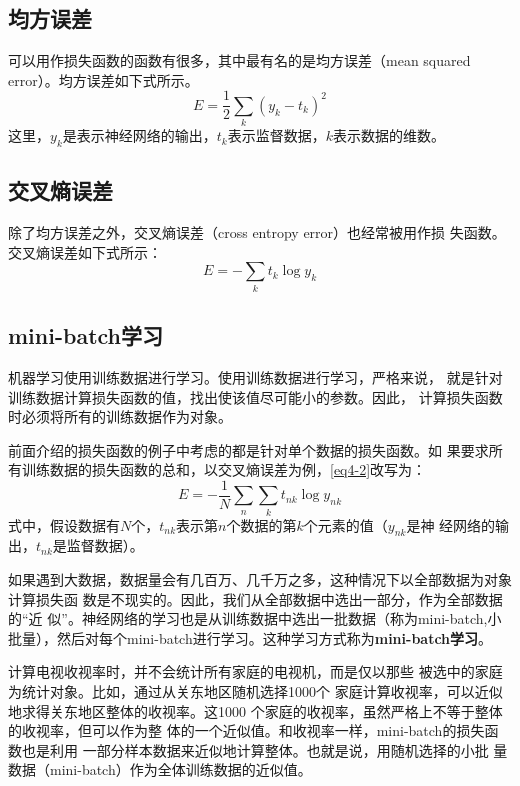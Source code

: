 \subsection{均方误差}
可以用作损失函数的函数有很多，其中最有名的是均方误差（mean squared
error）。均方误差如下式所示。
\begin{equation}
    \label{eq4-1}
    E=\frac{1}{2}\sum\limits_k(y_k-t_k)^2
\end{equation}
这里，$y_k$是表示神经网络的输出，$t_k$表示监督数据，$k$表示数据的维数。

\subsection{交叉熵误差}
除了均方误差之外，交叉熵误差（cross entropy error）也经常被用作损
失函数。交叉熵误差如下式所示：
\begin{equation}
    \label{eq4-2}
    E=-\sum \limits_k t_k\log y_k
\end{equation}
\subsection{mini-batch学习}
机器学习使用训练数据进行学习。使用训练数据进行学习，严格来说，
就是针对训练数据计算损失函数的值，找出使该值尽可能小的参数。因此，
计算损失函数时必须将所有的训练数据作为对象。

前面介绍的损失函数的例子中考虑的都是针对单个数据的损失函数。如
果要求所有训练数据的损失函数的总和，以交叉熵误差为例，\autoref{eq4-2}改写为：
\begin{equation}
    \label{eq4-3}
    E=-\frac{1}{N}\sum_n\sum_k t_{nk}\log y_{nk}
\end{equation}
式中，假设数据有$N$个，$t_{nk}$表示第$n$个数据的第$k$个元素的值（$y_{nk}$是神
经网络的输出，$t_{nk}$是监督数据）。

如果遇到大数据，数据量会有几百万、几千万之多，这种情况下以全部数据为对象计算损失函
数是不现实的。因此，我们从全部数据中选出一部分，作为全部数据的“近
似”。神经网络的学习也是从训练数据中选出一批数据（称为mini-batch,小
批量），然后对每个mini-batch进行学习。这种学习方式称为\textbf{mini-batch学习}。

\begin{tcolorbox}
    计算电视收视率时，并不会统计所有家庭的电视机，而是仅以那些
    被选中的家庭为统计对象。比如，通过从关东地区随机选择1000个
    家庭计算收视率，可以近似地求得关东地区整体的收视率。这1000
    个家庭的收视率，虽然严格上不等于整体的收视率，但可以作为整
    体的一个近似值。和收视率一样，mini-batch的损失函数也是利用
    一部分样本数据来近似地计算整体。也就是说，用随机选择的小批
    量数据（mini-batch）作为全体训练数据的近似值。
\end{tcolorbox}


